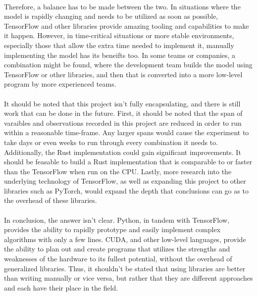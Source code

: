 \documentclass[12pt]{article}
\begin{document}
\paragraph{}
Therefore, a balance has to be made between the two.
In situations where the model is rapidly changing and needs to be utilized as soon as possible, TensorFlow and other libraries provide amazing tooling and capabilities to make it happen.
However, in time-critical situations or more stable environments, especially those that allow the extra time needed to implement it, manually implementing the model has its beneifts too.
In some teams or companies, a combination might be found, where the development team builds the model using TensorFlow or other libraries, and then that is converted into a more low-level program by more experienced teams.

\paragraph{}
It should be noted that this project isn't fully encapsulating, and there is still work that can be done in the future.
First, it should be noted that the span of varaibles and observations recorded in this project are reduced in order to run within a reasonable time-frame.
Any larger spans would cause the experiment to take days or even weeks to run through every combination it needs to.
Additionally, the Rust implementation could gain significant improvements.
It should be feasable to build a Rust implementation that is comparable to or faster than the TensorFlow when run on the CPU.
Lastly, more research into the underlying technology of TensorFlow, as well as expanding this project to other libraries such as PyTorch, would expand the depth that conclusions can go as to the overhead of these libraries.

\paragraph{}
In conclusion, the answer isn't clear.
Python, in tandem with TensorFlow, provides the ability to rapidly prototype and easily implement complex algorithms with only a few lines.
CUDA, and other low-level languages, provide the ability to plan out and create programs that utilizes the strengths and weaknesses of the hardware to its fullest potential, without the overhead of generalized libraries.
Thus, it shouldn't be stated that using libraries are better than writing manually or vice versa, but rather that they are different approaches and each have their place in the field.



\newpage


\end{document}
